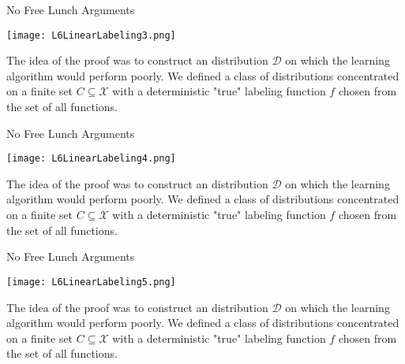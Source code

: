 \documentclass[10pt, table, dvipsnames, handout]{beamer}
\newcommand{\cX}{\ensuremath{\mathcal{X}}}
\begin{document}
\begin{frame}[fragile]{No Free Lunch Arguments}
  \begin{minipage}[t][0.6\textheight][t]{\textwidth}
	\centering \texttt{[image: L6LinearLabeling3.png]} 
  \end{minipage}
  \vfill
  \begin{minipage}[t][0.4\textheight][t]{\textwidth}
The idea of the proof was to construct an distribution $\mathcal{D}$ on which the learning algorithm would perform poorly. \pause We defined a class of distributions concentrated on a finite set $C\subseteq \cX$ with a deterministic "true" labeling function $f$ chosen from the set of all functions. 
\end{minipage}

\end{frame}


\begin{frame}[fragile]{No Free Lunch Arguments}
  \begin{minipage}[t][0.6\textheight][t]{\textwidth}
	\centering \texttt{[image: L6LinearLabeling4.png]} 
  \end{minipage}
  \vfill
  \begin{minipage}[t][0.4\textheight][t]{\textwidth}
The idea of the proof was to construct an distribution $\mathcal{D}$ on which the learning algorithm would perform poorly. \pause We defined a class of distributions concentrated on a finite set $C\subseteq \cX$ with a deterministic "true" labeling function $f$ chosen from the set of all functions. 
\end{minipage}

\end{frame}



\begin{frame}[fragile]{No Free Lunch Arguments}
  \begin{minipage}[t][0.6\textheight][t]{\textwidth}
	\centering \texttt{[image: L6LinearLabeling5.png]} 
  \end{minipage}
  \vfill
  \begin{minipage}[t][0.4\textheight][t]{\textwidth}
The idea of the proof was to construct an distribution $\mathcal{D}$ on which the learning algorithm would perform poorly. \pause We defined a class of distributions concentrated on a finite set $C\subseteq \cX$ with a deterministic "true" labeling function $f$ chosen from the set of all functions. 
\end{minipage}

\end{frame}
\end{document}
